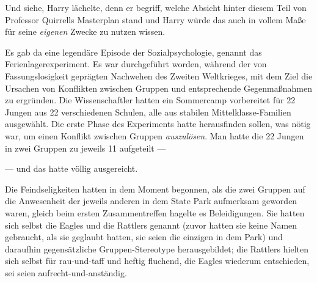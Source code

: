 Und siehe, Harry lächelte, denn er begriff, welche Absicht hinter diesem Teil von Professor Quirrells Masterplan stand und Harry würde das auch in vollem Maße für seine \emph{eigenen} Zwecke zu nutzen wissen.

Es gab da eine legendäre Episode der Sozialpsychologie, genannt das Ferienlagerexperiment. Es war durchgeführt worden, während der von Fassungslosigkeit geprägten Nachwehen des Zweiten Weltkrieges, mit dem Ziel die Ursachen von Konflikten zwischen Gruppen und entsprechende Gegenmaßnahmen zu ergründen. Die Wissenschaftler hatten ein Sommercamp vorbereitet für 22 Jungen aus 22 verschiedenen Schulen, alle aus stabilen Mittelklasse-Familien ausgewählt. Die erste Phase des Experiments hatte herausfinden sollen, was nötig war, um einen Konflikt zwischen Gruppen \emph{auszulösen}. Man hatte die 22 Jungen in zwei Gruppen zu jeweils 11 aufgeteilt —

— und das hatte völlig ausgereicht.

Die Feindseligkeiten hatten in dem Moment begonnen, als die zwei Gruppen auf die Anwesenheit der jeweils anderen in dem State Park aufmerksam geworden waren, gleich beim ersten Zusammentreffen hagelte es Beleidigungen. Sie hatten sich selbst die Eagles und die Rattlers genannt (zuvor hatten sie keine Namen gebraucht, als sie geglaubt hatten, sie seien die einzigen in dem Park) und daraufhin gegensätzliche Gruppen-Stereotype herausgebildet; die Rattlers hielten sich selbst für rau-und-taff und heftig fluchend, die Eagles wiederum entschieden, sei seien aufrecht-und-anständig.


